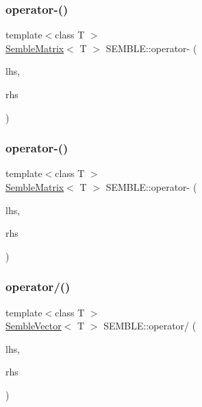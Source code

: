\subsubsection{\texorpdfstring{operator-\/()}{operator-()}\hspace{0.1cm}{\footnotesize\ttfamily [7/8]}}
{\footnotesize\ttfamily template$<$class T $>$ \\
\mbox{\hyperlink{structSEMBLE_1_1SembleMatrix}{Semble\+Matrix}}$<$ T $>$ S\+E\+M\+B\+L\+E\+::operator-\/ (\begin{DoxyParamCaption}\item[{const \mbox{\hyperlink{structSEMBLE_1_1SembleMatrix}{Semble\+Matrix}}$<$ T $>$ \&}]{lhs,  }\item[{const itpp\+::\+Mat$<$ T $>$ \&}]{rhs }\end{DoxyParamCaption})}

\mbox{\label{namespaceSEMBLE_aba06b25e41129b1a234ea1c281a99b46}} 
\subsubsection{\texorpdfstring{operator-\/()}{operator-()}\hspace{0.1cm}{\footnotesize\ttfamily [8/8]}}
{\footnotesize\ttfamily template$<$class T $>$ \\
\mbox{\hyperlink{structSEMBLE_1_1SembleMatrix}{Semble\+Matrix}}$<$ T $>$ S\+E\+M\+B\+L\+E\+::operator-\/ (\begin{DoxyParamCaption}\item[{const itpp\+::\+Mat$<$ T $>$ \&}]{lhs,  }\item[{const \mbox{\hyperlink{structSEMBLE_1_1SembleMatrix}{Semble\+Matrix}}$<$ T $>$ \&}]{rhs }\end{DoxyParamCaption})}

\mbox{\label{namespaceSEMBLE_a6f10a4c34958ccefef1fd26477673c01}} 
\subsubsection{\texorpdfstring{operator/()}{operator/()}\hspace{0.1cm}{\footnotesize\ttfamily [1/6]}}
{\footnotesize\ttfamily template$<$class T $>$ \\
\mbox{\hyperlink{structSEMBLE_1_1SembleVector}{Semble\+Vector}}$<$ T $>$ S\+E\+M\+B\+L\+E\+::operator/ (\begin{DoxyParamCaption}\item[{const \mbox{\hyperlink{structSEMBLE_1_1SembleVector}{Semble\+Vector}}$<$ T $>$ \&}]{lhs,  }\item[{const T \&}]{rhs }\end{DoxyParamCaption})}

